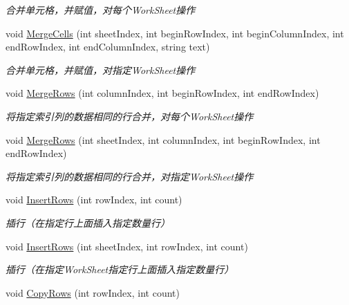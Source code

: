 \begin{DoxyCompactItemize}
\begin{DoxyCompactList}\small\item\em 合并单元格，并赋值，对每个\-Work\-Sheet操作 \end{DoxyCompactList}\item 
void \hyperlink{class_x_c_l_net_tools_1_1_data_handler_1_1_excel_helper_a59d4bebbd2294f88c1d75488330f2d02}{Merge\-Cells} (int sheet\-Index, int begin\-Row\-Index, int begin\-Column\-Index, int end\-Row\-Index, int end\-Column\-Index, string text)
\begin{DoxyCompactList}\small\item\em 合并单元格，并赋值，对指定\-Work\-Sheet操作 \end{DoxyCompactList}\item 
void \hyperlink{class_x_c_l_net_tools_1_1_data_handler_1_1_excel_helper_a6c59b5b2b3b6b38952049c089bdfdf60}{Merge\-Rows} (int column\-Index, int begin\-Row\-Index, int end\-Row\-Index)
\begin{DoxyCompactList}\small\item\em 将指定索引列的数据相同的行合并，对每个\-Work\-Sheet操作 \end{DoxyCompactList}\item 
void \hyperlink{class_x_c_l_net_tools_1_1_data_handler_1_1_excel_helper_a2e506b7e3f336e106a752cbfa3e5329c}{Merge\-Rows} (int sheet\-Index, int column\-Index, int begin\-Row\-Index, int end\-Row\-Index)
\begin{DoxyCompactList}\small\item\em 将指定索引列的数据相同的行合并，对指定\-Work\-Sheet操作 \end{DoxyCompactList}\item 
void \hyperlink{class_x_c_l_net_tools_1_1_data_handler_1_1_excel_helper_a11c7c3f26140bc6f8bfd3f2fee54be60}{Insert\-Rows} (int row\-Index, int count)
\begin{DoxyCompactList}\small\item\em 插行（在指定行上面插入指定数量行） \end{DoxyCompactList}\item 
void \hyperlink{class_x_c_l_net_tools_1_1_data_handler_1_1_excel_helper_a2dda31df749974f5441d442ea21b5183}{Insert\-Rows} (int sheet\-Index, int row\-Index, int count)
\begin{DoxyCompactList}\small\item\em 插行（在指定\-Work\-Sheet指定行上面插入指定数量行） \end{DoxyCompactList}\item 
void \hyperlink{class_x_c_l_net_tools_1_1_data_handler_1_1_excel_helper_a0124826488de4af30d2eaba3fa911500}{Copy\-Rows} (int row\-Index, int count)

\end{DoxyCompactItemize}
